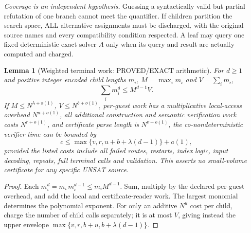 \documentclass[11pt]{article}
\newtheorem{lemma}[theorem]{Lemma}
\begin{document}
\emph{Coverage is an independent hypothesis.} Guessing a syntactically
valid but partial refutation of one branch cannot meet the quantifier.
If children partition the search space, ALL alternative assignments must
be discharged, with the original source names and every compatibility
condition respected. A leaf may query one fixed deterministic exact
solver $A$ only when its query and result are actually computed and charged.

\begin{lemma}[Weighted terminal work: PROVED/EXACT arithmetic]
For $d\ge1$ and positive integer encoded child lengths $m_i$,
$M=\max_i m_i$ and $V=\sum_i m_i$,
\[
 \sum_i m_i^d\le M^{d-1}V.
\]
If $M\le N^{\lambda+o(1)}$, $V\le N^{b+o(1)}$,
per-guest work has a multiplicative local-access overhead
$N^{u+o(1)}$, all additional construction and semantic verification
work costs $N^{r+o(1)}$, and certificate parse length is
$N^{v+o(1)}$, the co-nondeterministic verifier time can be bounded by
\begin{equation}\label{eq:time}
 c\le \max\{v,r,u+b+\lambda(d-1)\}+o(1),
\end{equation}
\emph{provided} the listed costs include all failed routes, restarts,
index logic, input decoding, repeats, full terminal calls and validation.
This asserts no small-volume certificate for any specific UNSAT source.
\end{lemma}
\begin{proof}
Each $m_i^d=m_i\,m_i^{d-1}\le m_i M^{d-1}$.
Sum, multiply by the declared per-guest overhead, and add the local and
certificate-reader work. The largest monomial determines the polynomial
exponent. For only an additive $N^u$ cost per child, charge the number
of child calls separately; it is at most $V$, giving instead the
upper envelope $\max\{v,r,b+u,b+\lambda(d-1)\}$.
\end{proof}
\end{document}
